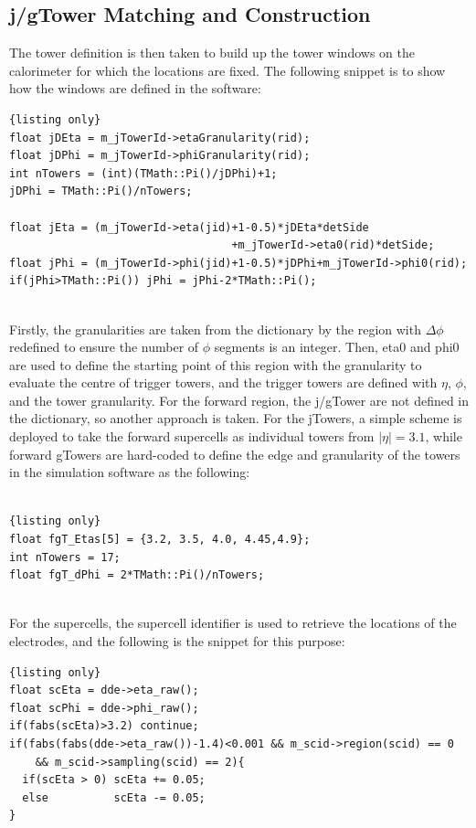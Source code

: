 \subsection{j/gTower Matching and Construction}
The tower definition is then taken to build up the tower windows on the calorimeter for which the locations are fixed. The following snippet is to show how the windows are defined in the software:
\\
\begin{lstlisting}{listing only}
float jDEta = m_jTowerId->etaGranularity(rid);
float jDPhi = m_jTowerId->phiGranularity(rid);
int nTowers = (int)(TMath::Pi()/jDPhi)+1;
jDPhi = TMath::Pi()/nTowers;

float jEta = (m_jTowerId->eta(jid)+1-0.5)*jDEta*detSide
                                  +m_jTowerId->eta0(rid)*detSide;
float jPhi = (m_jTowerId->phi(jid)+1-0.5)*jDPhi+m_jTowerId->phi0(rid);
if(jPhi>TMath::Pi()) jPhi = jPhi-2*TMath::Pi(); 
\end{lstlisting}
\noindent
\\Firstly, the granularities are taken from the dictionary by the region with $\Delta\phi$ redefined to ensure the number of $\phi$ segments is an integer. Then, eta0 and phi0 are used to define the starting point of this region with the granularity to evaluate the centre of trigger towers, and the trigger towers are defined with $\eta$, $\phi$, and the tower granularity. For the forward region, the j/gTower are not defined in the dictionary, so another approach is taken. For the jTowers, a simple scheme is deployed to take the forward supercells as individual towers from $|\eta|=3.1$, while forward gTowers are hard-coded to define the edge and granularity of the towers in the simulation software as the following:
\\
\\
\begin{lstlisting}{listing only}
float fgT_Etas[5] = {3.2, 3.5, 4.0, 4.45,4.9};
int nTowers = 17;
float fgT_dPhi = 2*TMath::Pi()/nTowers;
\end{lstlisting}
\noindent
\\For the supercells, the supercell identifier is used to retrieve the locations of the electrodes, and the following is the snippet for this purpose:
\\
\begin{lstlisting}{listing only}
float scEta = dde->eta_raw();
float scPhi = dde->phi_raw();
if(fabs(scEta)>3.2) continue;
if(fabs(fabs(dde->eta_raw())-1.4)<0.001 && m_scid->region(scid) == 0 
    && m_scid->sampling(scid) == 2){
  if(scEta > 0) scEta += 0.05;
  else          scEta -= 0.05;
}

\end{lstlisting}
